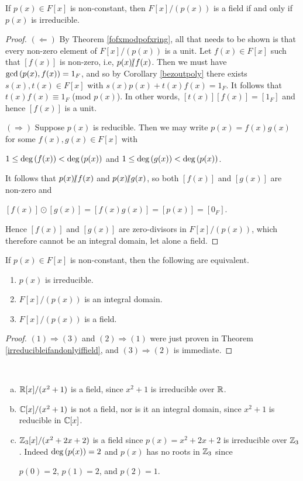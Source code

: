\documentclass[11pt,fleqn,dvipsnames,usenames]{article}
\begin{document}
\begin{theorem}\label{irreducibleifandonlyiffield}
If $p(x)\in F[x]$ is non-constant, then $F[x]/(p(x))$ is a field if and only if $p(x)$ is irreducible.
\end{theorem}
%
\begin{proof}
$(\Leftarrow)$ By Theorem \ref{fofxmodpofxring}, all that needs to be shown is that every non-zero element of $F[x]/(p(x))$ is a unit.  Let $f(x)\in F[x]$ such that $[f(x)]$ is non-zero, i.e, $p(x)|\kern-0.9ex{/} f(x)$.  Then we must have $\GCD{p(x),f(x)} = \nolinebreak 1_{F}$, and so by Corollary \ref{bezoutpoly} there exists $s(x),t(x)\in F[x]$ with $s(x)p(x) + t(x)f(x) = 1_{F}$.  It follows that $t(x)f(x)\equiv 1_{F}$ (mod $p(x)$).  In other words, $[t(x)][f(x)] = [1_{F}]$ and hence $[f(x)]$ is a unit.
\vsp

$(\Rightarrow)$ Suppose $p(x)$ is reducible.  Then we may write $p(x) = f(x)g(x)$ for some $f(x),g(x)\in F[x]$ with
\begin{center}
$1\leq \text{deg}\left(f(x)\right) < \text{deg}\left(p(x)\right)$ and $1\leq \text{deg}\left(g(x)\right) < \text{deg}\left(p(x)\right)$.
\end{center}
It follows that $p(x)|\kern-0.9ex{/} f(x)$ and $p(x)|\kern-0.9ex{/} g(x)$, so both $[f(x)]$ and $[g(x)]$ are non-zero and
\begin{center}
$[f(x)]\odot[g(x)] = [f(x)g(x)] = [p(x)] = [0_{F}]$.
\end{center}
Hence $[f(x)]$ and $[g(x)]$ are zero-divisors in $F[x]/(p(x))$, which therefore cannot be an integral domain, let alone a field.
\end{proof}
%
\begin{corollary}
If $p(x)\in F[x]$ is non-constant, then the following are equivalent.
\begin{enumerate}[(1)]
\item $p(x)$ is irreducible.
\item $F[x]/(p(x))$ is an integral domain.
\item $F[x]/(p(x))$ is a field.
\end{enumerate}
\end{corollary}
%
\begin{proof}
$(1)\Rightarrow (3)$ and $(2)\Rightarrow (1)$ were just proven in Theorem \ref{irreducibleifandonlyiffield}, and $(3)\Rightarrow (2)$ is immediate.
\end{proof}
%
\begin{examples}~
\begin{enumerate}[(a)]
\item $\mathbb{R}[x]/(x^2+1)$ is a field, since $x^2 + 1$ is irreducible over $\mathbb{R}$.
\item $\mathbb{C}[x]/(x^2+1)$ is not a field, nor is it an integral domain, since $x^2 + 1$ is reducible in $\mathbb{C}[x]$.
\item $\mathbb{Z}_3[x]/(x^2 + 2x + 2)$ is a field since $p(x) = x^2 + 2x + 2$ is irreducible over $\mathbb{Z}_3$.  Indeed $\text{deg}\left(p(x)\right) = 2$ and $p(x)$ has no roots in $\mathbb{Z}_3$ since
\begin{center}
$p(0) = 2$, $p(1) = 2$, and $p(2) = 1$.
\end{center}
\end{enumerate}
\end{examples}
\end{document}
